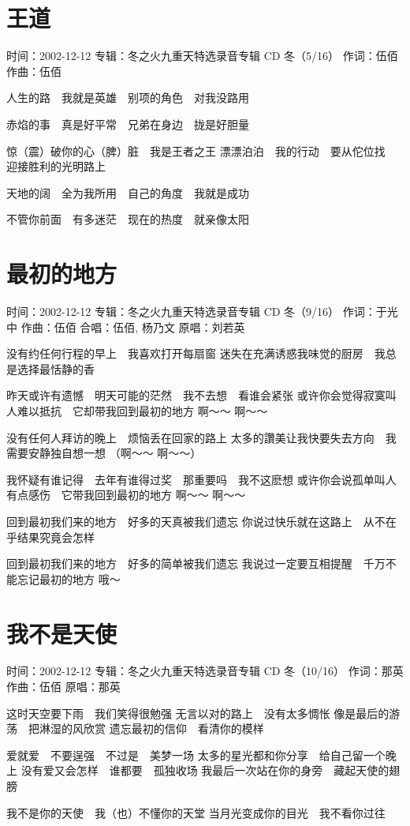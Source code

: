 \documentclass[UTF8,a4paper,oneside,twocolumn,12pt]{ctexbook}
\newcommand{\infopair}[2]{\textbullet #1：#2}
\newcommand{\zc}[1][伍佰]{\infopair{作词}{#1}}
\newcommand{\zq}[1][伍佰]{\infopair{作曲}{#1}}
\newcommand{\zj}[1]{\infopair{专辑}{#1}}
\newcommand{\yc}[1]{\infopair{原唱}{#1}}
\newcommand{\sj}[1]{\infopair{时间}{#1}}
\newenvironment{info}{\begin{flushleft}\kaishu
	}
	{\end{flushleft}\normalsize\yahei\par}
\newenvironment{lyric}{
	}
{}
\begin{document}
\section{王道}
\begin{info}
	\sj{2002-12-12}
	\zj{冬之火九重天特选录音专辑 CD 冬（5/16）}
	\zc
	\zq
\end{info}
\begin{lyric}
	人生的路　我就是英雄　别项的角色　对我没路用

	赤焰的事　真是好平常　兄弟在身边　拢是好胆量

	惊（震）破你的心（脾）脏　我是王者之王
	漂漂泊泊　我的行动　要从佗位找　迎接胜利的光明路上

	天地的阔　全为我所用　自己的角度　我就是成功

	不管你前面　有多迷茫　现在的热度　就亲像太阳
\end{lyric}

\section{最初的地方}
\begin{info}
	\sj{2002-12-12}
	\zj{冬之火九重天特选录音专辑 CD 冬（9/16）}
	\zc[于光中]
	\zq
	\infopair{合唱}{伍佰, 杨乃文}
	\yc{刘若英}
\end{info}
\begin{lyric}
	没有约任何行程的早上　我喜欢打开每扇窗
	迷失在充满诱惑我味觉的厨房　我总是选择最恬静的香

	昨天或许有遗憾　明天可能的茫然　我不去想　看谁会紧张
	或许你会觉得寂寞叫人难以抵抗　它却带我回到最初的地方
	啊～～ 啊～～

	没有任何人拜访的晚上　烦恼丢在回家的路上
	太多的讚美让我快要失去方向　我需要安静独自想一想
	（啊～～ 啊～～）

	我怀疑有谁记得　去年有谁得过奖　那重要吗　我不这麽想
	或许你会说孤单叫人有点感伤　它带我回到最初的地方
	啊～～ 啊～～

	回到最初我们来的地方　好多的天真被我们遗忘
	你说过快乐就在这路上　从不在乎结果究竟会怎样

	回到最初我们来的地方　好多的简单被我们遗忘
	我说过一定要互相提醒　千万不能忘记最初的地方
	哦～
\end{lyric}

\section{我不是天使}
\begin{info}
	\sj{2002-12-12}
	\zj{冬之火九重天特选录音专辑 CD 冬（10/16）}
	\zc[那英]
	\zq
	\yc{那英}
\end{info}
\begin{lyric}
	这时天空要下雨　我们笑得很勉强
	无言以对的路上　没有太多惆怅
	像是最后的游荡　把淋湿的风欣赏
	遗忘最初的信仰　看清你的模样

	爱就爱　不要逞强　不过是　美梦一场
	太多的星光都和你分享　给自己留一个晚上
	没有爱又会怎样　谁都要　孤独收场
	我最后一次站在你的身旁　藏起天使的翅膀

	我不是你的天使　我（也）不懂你的天堂
	当月光变成你的目光　我不看你过往
\end{lyric}
\end{document}
